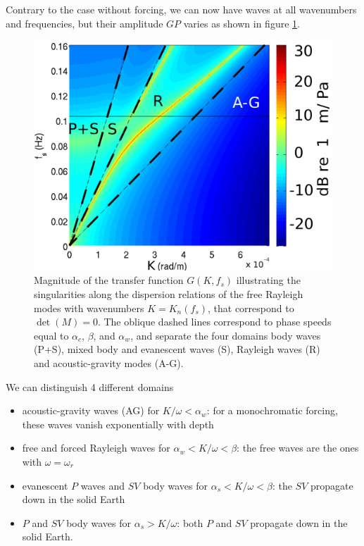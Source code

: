 Contrary to the case without forcing, we can now have waves at all wavenumbers and frequencies, but their amplitude $G P$ varies 
as shown in figure \ref{fig:k_f_plot}. 
\begin{figure}[htb]
\centerline{\includegraphics[width=0.7\columnwidth]{FIGS_CH_SISMO/k_f_plot.pdf}}
  \caption{Magnitude of the transfer function $G(K,f_s)$ illustrating the 
singularities along the dispersion relations of the free Rayleigh modes with wavenumbers $K=K_{n}(f_s)$, 
that correspond to $\det(M)=0$. The oblique 
dashed lines correspond to phase speeds equal to $\alpha_c$, $\beta$, and $\alpha_w$, and separate the four domains 
body waves (P+S), mixed body and evanescent waves (S), Rayleigh waves (R) and acoustic-gravity modes (A-G).
}
\label{fig:k_f_plot}
\end{figure}
We can distinguish 4 different domains 
\begin{itemize}
  \item acoustic-gravity waves (AG) for $K/\omega < \alpha_w$: for a monochromatic forcing, these waves vanish exponentially with depth
  \item free and forced Rayleigh waves for  $\alpha_w < K/\omega < \beta$: the free waves are the ones with $\omega=\omega_r$
  \item evanescent $P$ waves and $SV$ body waves  for  $\alpha_s < K/\omega < \beta$: the $SV$ propagate down in the solid Earth 
  \item $P$ and $SV$ body waves for  $\alpha_s > K/\omega$: both $P$ and $SV$ propagate down in the solid Earth.
 \end{itemize}

